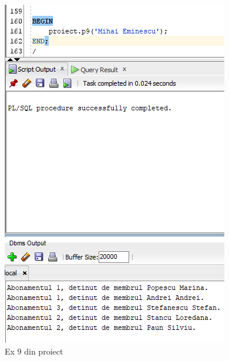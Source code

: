 \documentclass[12pt]{article}
\begin{document}
\begin{figure}[!htb]
\includegraphics[max width=\linewidth]{imgs/ex13_4.png}
\caption{Ex 9 din proiect}
\label{fig:ex13_4}
\end{figure}	
\end{document}
